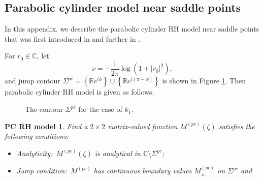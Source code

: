 \documentclass[11pt]{article}
\numberwithin{equation}{section}
\newtheorem{parabolic}{PC RH model}
\begin{document}
\begin{appendices}
\section{Parabolic cylinder   model near saddle points}\label{appendix1}

In this appendix. we describe the
parabolic cylinder RH model near saddle points that was first introduced in \cite{its1981asymptotics} and further in \cite{zhou-1993, borghese-2018-2}.




For $r_0 \in \mathbb{C} $,   let
$$\nu= -\frac{1}{2\pi} \log (1+|r_0|^2),$$
and jump contour   $\Sigma^{p c}=\left\{\mathbb{R} e^{i \phi}\right\} \cup\left\{\mathbb{R} e^{i(\pi-\phi)}\right\}$ is shown in Figure \ref{Fig9}. Then parabolic cylinder RH model is given as
  follows.

  \begin{figure}[!ht]
    \centering
    \hspace*{-1.5cm}
    \caption{The contour \(\Sigma^{pc}\) for the case of $k_1$.}
     \label{Fig9}
\end{figure}
\FloatBarrier

\begin{parabolic}\label{rhp10}
Find a $2\times2$ matrix-valued function $M^{\left(pc \right)}(\zeta) $ satisfies the following conditions:
\begin{itemize}
    \item Analyticity:\ $M^{\left(pc \right)}(\zeta)$ is analytical in $\mathbb{C} \setminus \Sigma^{p c}$;
    \item Jump condition:\ $M^{\left(pc \right)}$ has continuous boundary values $M_{ \pm}^{\left(pc \right)}$ on $\Sigma^{p c}$ and


\end{itemize}
\end{parabolic}
\end{appendices}
\end{document}
